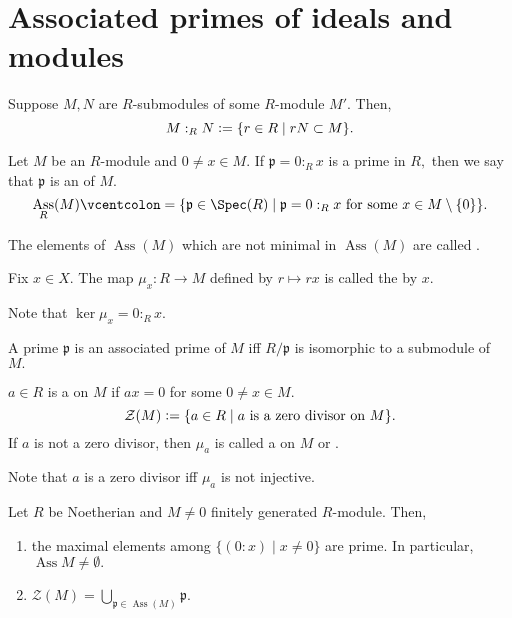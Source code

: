 \documentclass[12pt]{article}	%
\DeclareMathOperator{\Ass}{Ass}
\begin{document}
\section{Associated primes of ideals and modules} %
\begin{defn}%
	Suppose $M, N$ are $R$-submodules of some $R$-module $M'.$ Then,
	\begin{equation*} 
		M:_RN \vcentcolon= \{r \in R \mid rN \subset M\}.
	\end{equation*}
\end{defn}
\begin{defn}%
	Let $M$ be an $R$-module and $0 \neq x \in M.$ If $\mathfrak{p} = 0:_Rx$ is a prime in $R,$ then we say that $\mathfrak{p}$ is an  of $M.$
	\begin{equation*} 
		\Ass_R(M) \vcentcolon= \{\mathfrak{p} \in \Spec(R) \mid \mathfrak{p} = 0 :_R x \text{ for some } x \in M \setminus \{0\}\}.
	\end{equation*}
\end{defn}
\begin{defn}%
	The elements of $\Ass(M)$ which are not minimal in $\Ass(M)$ are called .
\end{defn}
\begin{defn}%
	Fix $x \in X.$ The map $\mu_x : R \to M$ defined by $r \mapsto rx$ is called the  by $x.$
\end{defn}
Note that $\ker \mu_x = 0:_Rx.$

\begin{prop}
	A prime $\mathfrak{p}$ is an associated prime of $M$ iff $R/\mathfrak{p}$ is isomorphic to a submodule of $M.$
\end{prop}

\begin{defn}%
	$a \in R$ is a  on $M$ if $ax = 0$ for some $0 \neq x \in M.$
	\begin{equation*} 
		\mathcal{Z}(M) \vcentcolon= \{a \in R \mid a \text{ is a zero divisor on }M\}.
	\end{equation*} 
	If $a$ is not a zero divisor, then $\mu_a$ is called a  on $M$ or .
\end{defn}

Note that $a$ is a zero divisor iff $\mu_a$ is not injective.

\begin{prop}
	Let $R$ be Noetherian and $M \neq 0$ finitely generated $R$-module. Then,
	\begin{enumerate}
		\item the maximal elements among $\{(0 : x) \mid x \neq 0\}$ are prime. In particular, $\Ass M \neq \emptyset.$
		\item $\mathcal{Z}(M) = \bigcup_{\mathfrak{p} \in \Ass(M)}\mathfrak{p}.$
	\end{enumerate}
\end{prop}
\end{document}
